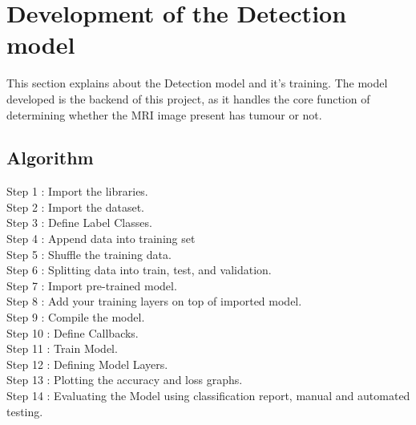 
\section{Development of the Detection model}
This section explains about the Detection model and it's training. The model developed is the backend of this project, as it handles the core function of determining whether the MRI image present has tumour or not.
\subsection{Algorithm}
Step 1 : Import the libraries.\\ 
Step 2 : Import the dataset.\\ 
Step 3 : Define Label Classes.\\ 
Step 4 : Append data into training set\\ 
Step 5 : Shuffle the training data.\\
Step 6 : Splitting data into train, test, and validation.\\
Step 7 : Import pre-trained model.\\ 
Step 8 : Add your training layers on top of imported model.\\
Step 9 : Compile the model.\\ 
Step 10 : Define Callbacks.\\ 
Step 11 : Train Model.\\ 
Step 12 : Defining Model Layers.\\ 
Step 13 : Plotting the accuracy and loss graphs.\\ 
Step 14 : Evaluating the Model using classification report, manual and automated testing.
